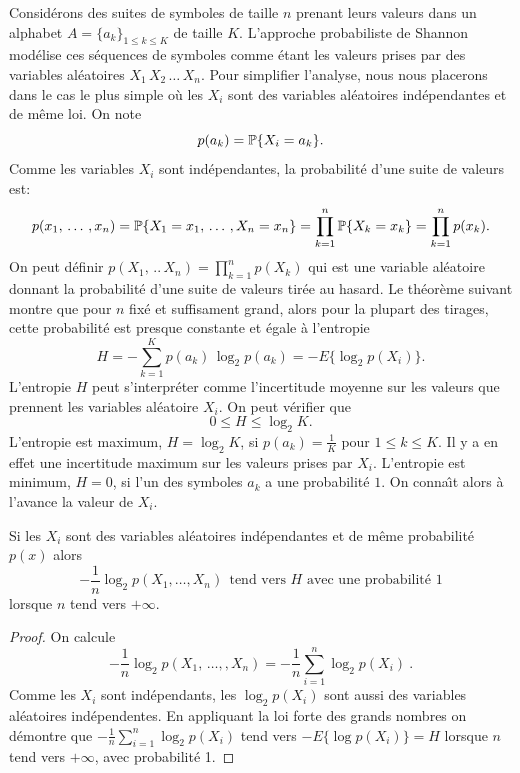 Consid\'erons des suites de symboles de taille $n$ prenant leurs
valeurs dans un alphabet $A = \{a_k \}_{1 \leq k \leq K}$
de taille $K$.
L'approche probabiliste de Shannon mod\'elise
ces s\'equences de symboles comme \'etant les valeurs prises
par des variables al\'eatoires $X_1\, X_2\,\dots\, X_n$.
Pour simplifier l'analyse, nous nous placerons dans le cas le
plus simple o\`u les $X_i$ sont des variables al\'eatoires
ind\'ependantes et de m\^eme loi. On note
\[
p(a_k) = \mathbb{P} \{ X_i = a_k \} .
\]
Comme les variables $X_i$ sont ind\'ependantes, la
probabilit\'e d'une suite de valeurs est:
\[
p(x_1,\, \dots\,, x_n) = \mathbb{P} \{X_1 = x_1 ,\, \dots\, , X_n = x_n \} =
\prod_{k=1}^n \mathbb{P} \{X_k = x_k \} = \prod_{k=1}^n p(x_k) .
\]
On peut d\'efinir $p(X_1 ,\, ..\, X_n) = \prod_{k=1}^n p(X_k)$
qui est une variable al\'eatoire donnant la probabilit\'e
d'une suite de valeurs tir\'ee au hasard.
Le th\'eor\`eme suivant montre que pour $n$ fix\'e
et suffisament grand, alors pour la plupart des
tirages, cette probabilit\'e est presque constante et
\'egale \`a l'entropie
\[
H = - \sum_{k=1}^K p(a_k)\, \log_2 p(a_k) = - E\{ \log_2 p(X_i)\} .
\]
L'entropie $H$ peut s'interpr\'eter comme
l'incertitude moyenne sur les valeurs
que prennent les variables al\'eatoire $X_i$.
On peut v\'erifier que
\[
0 \leq H \leq \log_2 K .
\]
L'entropie est maximum, $H = \log_2 K$, si
$p(a_k) = \frac 1 K$ pour $1 \leq k \leq K$.
Il y a en effet une incertitude maximum sur les valeurs prises
par $X_i$.
L'entropie est minimum, $H = 0$, si l'un des symboles $a_k$
a une probabilit\'e $1$.
On conna\^{\i}t alors \`a l'avance la valeur de $X_i$.

\begin{theorem}
\label{EquiTh}
Si les $X_i$ sont des variables al\'eatoires ind\'ependantes
et de m\^eme probabilit\'e $p(x)$ alors
\[
-\frac 1 n \log_2 p(X_1, \dots,X_n)~~\mbox{tend vers $H$ avec
une probabilit\'e $1$}
\]
lorsque $n$ tend vers $+\infty$.
\end{theorem}
\begin{proof}
On calcule
\[
- \frac 1 n \log_2 p(X_1,\, \dots ,, X_n) = - \frac 1 n \sum_{i=1}^n
\log_2 p(X_i)~.
\]
Comme les $X_i$ sont ind\'ependants, les $\log_2 p(X_i)$ sont aussi
des variables al\'eatoires ind\'ependentes.
En appliquant la loi forte des grands nombres 
on d\'emontre que
$- \frac 1 n \sum_{i=1}^n \log_2 p(X_i)$ tend
vers $- E\{ \log p(X_i)\} = H$ lorsque $n$ tend vers $+\infty$,
avec probabilit\'e 1.
\end{proof}

